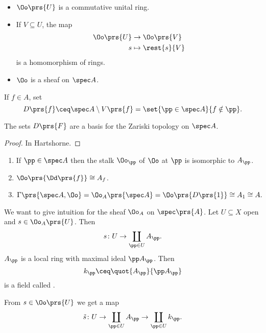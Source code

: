 \documentclass[10pt,a4paper,twoside,openany,hidelinks]{book}
\begin{document}
\begin{proposition}
\begin{itemize}
\item $\Oo\prs{U}$ is a commutative unital ring.
\item If $V \subseteq U$, the map
\begin{align*}
\Oo\prs{U} &\to \Oo\prs{V} \\
s &\mapsto \rest{s}{V}
\end{align*}
is a homomorphism of rings.
\item $\Oo$ is a sheaf on $\spec A$.
\end{itemize}
\end{proposition}

\begin{definition}
If $f \in A$, set \[D\prs{f} \ceq \spec A \setminus V\prs{f} = \set{\pp \in \spec A}{f \notin \pp} \text{.}\]
\end{definition}

\begin{lemma}
The sets $D\prs{F}$ are a basis for the Zariski topology on $\spec A$.
\end{lemma}

\begin{proof}
In Hartshorne.
\end{proof}

\begin{proposition}\label{proposition:spec_properties}
\begin{enumerate}
\item If $\pp \in \spec A$ then the stalk $\Oo_\pp$ of $\Oo$ at $\pp$ is isomorphic to $A_\pp$.
\item $\Oo\prs{\Dd\prs{f}} \cong A_f$.
\item
\[\Gamma\prs{\spec A, \Oo} = \Oo_A\prs{\spec A} = \Oo\prs{D\prs{1}} \cong A_1 \cong A \text{.}\]
\end{enumerate}
\end{proposition}


We want to give intuition for the sheaf $\Oo_A$ on $\spec\prs{A}$. Let $U \subseteq X$ open and $s \in \Oo_A\prs{U}$.
Then
\[s \colon U \to \coprod_{\pp \in U} A_\pp \text{.}\]
$A_\pp$ is a local ring with maximal ideal $\pp A_\pp$. Then
\[k_\pp \ceq \quot{A_\pp}{\pp A_\pp}\]
is a field called .

From $s \in \Oo\prs{U}$ we get a map
\[\tilde{s} \colon U \to \coprod_{\pp \in U} A_\pp \to \coprod_{\pp \in U} k_\pp \text{.}\]
\end{document}
